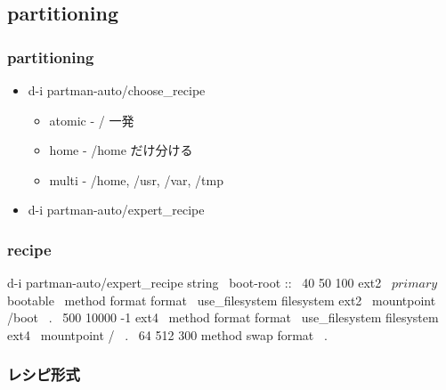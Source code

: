 \documentclass[mingoth,a4paper]{jsarticle}
\begin{document}
\subsection{partitioning}

\subsubsection{partitioning}
\begin{itemize}
\item d-i partman-auto/choose\_recipe
  \begin{itemize}
  \item atomic - / 一発
  \item home - /home だけ分ける
  \item multi - /home, /usr, /var, /tmp
  \end{itemize}
\item d-i partman-auto/expert\_recipe
\end{itemize}

\subsubsection{recipe}
\begin{commandline}
d-i partman-auto/expert_recipe string                         \
      boot-root ::                                            \
              40 50 100 ext2                                  \
                      $primary{ } $bootable{ }                \
                      method{ format } format{ }              \
                      use_filesystem{ } filesystem{ ext2 }    \
                      mountpoint{ /boot }                     \
              .                                               \
              500 10000 -1 ext4                               \
                      method{ format } format{ }              \
                      use_filesystem{ } filesystem{ ext4 }    \
                      mountpoint{ / }                         \
              .                                               \
              64 512 300%
                      method{ swap } format{ }                \
              .
\end{commandline}

\clearpage

\subsubsection{レシピ形式}
\end{document}
